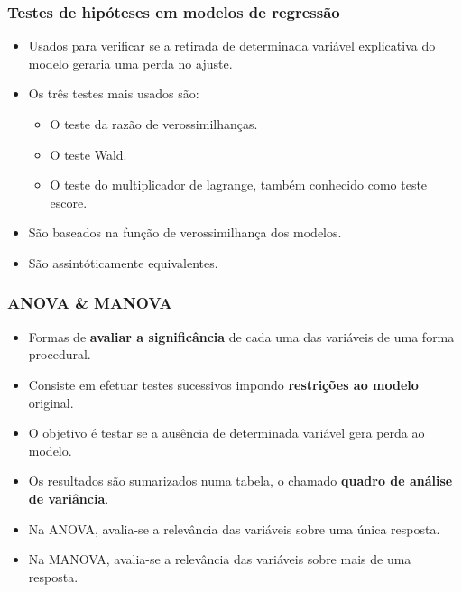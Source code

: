 \documentclass[10pt,
  aspectratio=169,
  serif,
  mathserif,
  professionalfont,
  compress,
  handout,
  ]{beamer}\usepackage[]{graphicx}\usepackage[]{color}
\begin{document}
\begin{frame}
  \frametitle{Testes de hipóteses em modelos de regressão}
  \begin{itemize}
    \itemsep 2ex
  
  \item Usados para verificar se a retirada de determinada variável explicativa do modelo geraria uma perda no ajuste.
  
  \item Os três testes mais usados são:

    \begin{itemize}
      \item O teste da razão de verossimilhanças.
      \item O teste Wald.
      \item O teste do multiplicador de lagrange, também conhecido como teste escore.
    \end{itemize}
  
  \item São baseados na função de verossimilhança dos modelos.
  
  \item São assintóticamente equivalentes.
  
  \end{itemize}
  
\end{frame}


\begin{frame}
  \frametitle{ANOVA \& MANOVA}

  \begin{itemize}
    \itemsep 2ex

  \item Formas de \textbf{avaliar a significância} de cada uma das variáveis de uma forma procedural.  
  
  \item Consiste em efetuar testes sucessivos impondo \textbf{restrições ao modelo} original. 

  \item O objetivo é testar se a ausência de determinada variável gera perda ao modelo. 

      \item Os resultados são sumarizados numa tabela, o chamado \textbf{quadro de análise de variância}.

  \item Na ANOVA, avalia-se a relevância das variáveis sobre uma única resposta. 

  \item Na MANOVA, avalia-se a relevância das variáveis sobre mais de uma resposta. 
  
  \end{itemize}

\end{frame}
\end{document}
